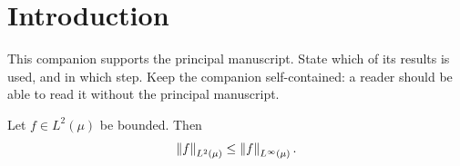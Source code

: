 
\section{Introduction}
\label{sec:introduction}

This companion supports the principal manuscript. State which of its
results is used, and in which step. Keep the companion self-contained:
a reader should be able to read it without the principal manuscript.

\begin{theorem}
\label{thm:support}
Let $f \in L^2(\mu)$ be bounded. Then
\begin{equation}
\label{eq:support}
  \left\lVert f \right\rVert_{L^2(\mu)} \le \left\lVert f \right\rVert_{L^\infty(\mu)} .
\end{equation}
\end{theorem}
